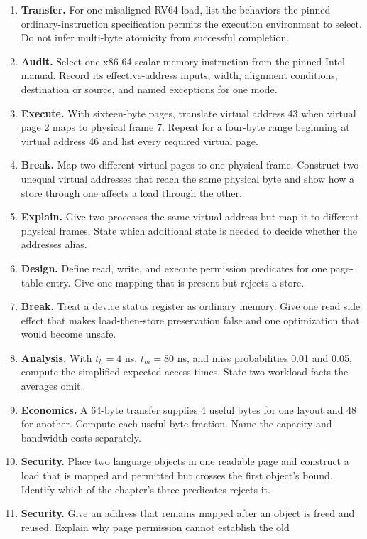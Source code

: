 \begin{enumerate}
\item \textbf{Transfer.} For one misaligned RV64 load, list the behaviors the
pinned ordinary-instruction specification permits the execution environment to select.
Do not infer multi-byte atomicity from successful completion.
\item \textbf{Audit.} Select one x86-64 scalar memory instruction from the
pinned Intel manual. Record its effective-address inputs, width, alignment
conditions, destination or source, and named exceptions for one mode.
\item \textbf{Execute.} With sixteen-byte pages, translate virtual address 43
when virtual page 2 maps to physical frame 7. Repeat for a four-byte range
beginning at virtual address 46 and list every required virtual page.
\item \textbf{Break.} Map two different virtual pages to one physical frame.
Construct two unequal virtual addresses that reach the same physical byte and
show how a store through one affects a load through the other.
\item \textbf{Explain.} Give two processes the same virtual address but map it
to different physical frames. State which additional state is needed to decide
whether the addresses alias.
\item \textbf{Design.} Define read, write, and execute permission predicates
for one page-table entry. Give one mapping that is present but rejects a store.
\item \textbf{Break.} Treat a device status register as ordinary memory. Give
one read side effect that makes load-then-store preservation false and one
optimization that would become unsafe.
\item \textbf{Analysis.} With \(t_h=4\) ns, \(t_m=80\) ns, and miss
probabilities 0.01 and 0.05, compute the simplified expected access times.
State two workload facts the averages omit.
\item \textbf{Economics.} A 64-byte transfer supplies 4 useful bytes for one
layout and 48 for another. Compute each useful-byte fraction. Name the capacity
and bandwidth costs separately.
\item \textbf{Security.} Place two language objects in one readable page and
construct a load that is mapped and permitted but crosses the first object's
bound. Identify which of the chapter's three predicates rejects it.
\item \textbf{Security.} Give an address that remains mapped after an object
is freed and reused. Explain why page permission cannot establish the old

\end{enumerate}
